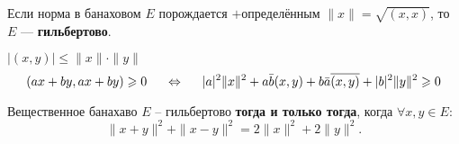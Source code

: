 \begin{to_def}
	Если норма в банаховом $E$ порождается $+$определённым $\|x\| = \sqrt{(x,x)}$, то $E$ --- \textbf{гильбертово}. 
\end{to_def}

\begin{to_thr}
	$|(x,y)| \leq \|x\| \cdot \|y\|$
	\begin{equation*}
		(ax + by, ax + by) \geq 0 
		\hspace{0.5 cm}
		\Leftrightarrow
		\hspace{0.5 cm}
		|a|^2 \|x\|^2 + a \bar{b} (x,y) + b \bar{a} \overline{(x,y)} + |b|^2 \|y\|^2 \geq 0
	\end{equation*}
\end{to_thr}

\begin{to_thr}
	Вещественное банахаво $E$ -- гильбертово \textbf{тогда и только тогда}, когда $\forall x,y \in E$:
	\begin{equation*}
		\|x+y\|^2 + \|x-y\|^2 = 2 \|x\|^2 + 2 \|y\|^2.
	\end{equation*}
\end{to_thr}